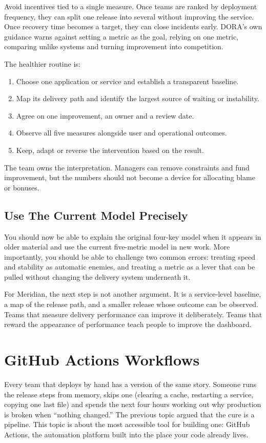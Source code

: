 Avoid incentives tied to a single measure. Once teams are ranked by deployment frequency, they can split one release into several without improving the service. Once recovery time becomes a target, they can close incidents early. DORA's own guidance warns against setting a metric as the goal, relying on one metric, comparing unlike systems and turning improvement into competition. \autocite{dora-metrics}


The healthier routine is:


\begin{enumerate}[leftmargin=*]
\item Choose one application or service and establish a transparent baseline.
\item Map its delivery path and identify the largest source of waiting or instability.
\item Agree on one improvement, an owner and a review date.
\item Observe all five measures alongside user and operational outcomes.
\item Keep, adapt or reverse the intervention based on the result.
\end{enumerate}

The team owns the interpretation. Managers can remove constraints and fund improvement, but the numbers should not become a device for allocating blame or bonuses.



\subsection{Use The Current Model Precisely}


You should now be able to explain the original four-key model when it appears in older material and use the current five-metric model in new work. More importantly, you should be able to challenge two common errors: treating speed and stability as automatic enemies, and treating a metric as a lever that can be pulled without changing the delivery system underneath it.


For Meridian, the next step is not another argument. It is a service-level baseline, a map of the release path, and a smaller release whose outcome can be observed. Teams that measure delivery performance can improve it deliberately. Teams that reward the appearance of performance teach people to improve the dashboard.

\section{GitHub Actions Workflows}
Every team that deploys by hand has a version of the same story. Someone runs the release steps from memory, skips one (clearing a cache, restarting a service, copying one last file) and spends the next four hours working out why production is broken when ``nothing changed.'' The previous topic argued that the cure is a pipeline. This topic is about the most accessible tool for building one: GitHub Actions, the automation platform built into the place your code already lives.


